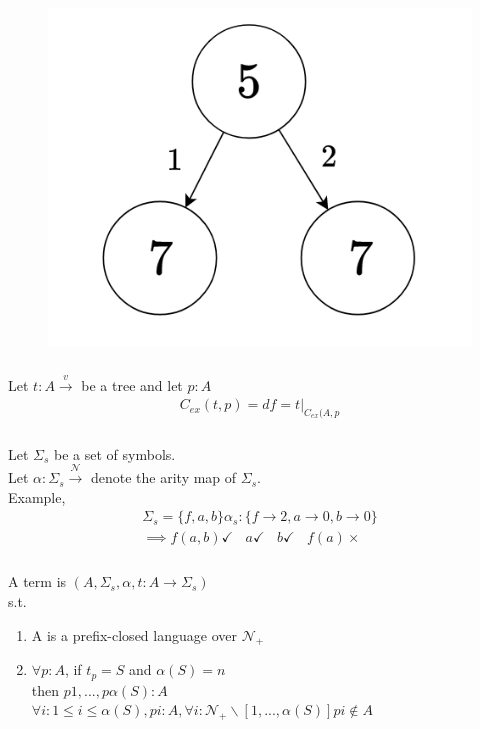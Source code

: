 \begin{figure}[htbp]
    \center
    \includegraphics[scale=0.6]{images/popl-4-3.png}
    \caption{}
\end{figure}

\subsubsection{}
Let $t:A\xrightarrow{v}$ be a tree and let $p:A$
\begin{gather}
    C_{ex}(t,p) = df = t \vert_{C_{ex}(A,p}
\end{gather}

\subsubsection{}
Let $\Sigma_{s}$ be a set of symbols.\\
Let $\alpha: \Sigma_{s} \xrightarrow{ \mathcal{N}}$ denote the arity map of $\Sigma_{s}$.\\

Example,\\
\begin{gather}
    \Sigma_{s} = \{f,a,b\}
    \alpha_{s}: \{f\xrightarrow{}2, a\xrightarrow{}0, b\xrightarrow{}0\}\\
    \implies f(a,b) \checkmark \ \ \ \ a \checkmark \ \ \ \ b \checkmark \ \ \ \ f(a) \times
\end{gather}

\subsubsection{}
A term is $(A,\Sigma_{s}, \alpha, t: A\xrightarrow{} \Sigma_{s})$\\
s.t.
\begin{enumerate}
    \item A is a prefix-closed language over $\mathcal{N}_{+}$
    \item $\forall p: A$, if $t_{p}=S$ and $\alpha(S)=n$\\
    then $p1,..., p\alpha(S): A$ \ \ \ \ \  \ \ \ 
    $\forall i: 1 \leq i \leq \alpha(S), pi: A, \forall i: \mathcal{N}_{+}\backslash[1,...,\alpha(S)]pi\notin A$
\end{enumerate}
\newpage
